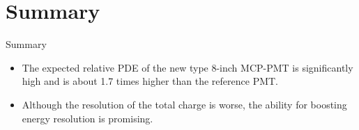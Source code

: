 \documentclass[aspectratio=169]{beamer}
\begin{document}
\section{Summary}
\begin{frame}{Summary}
    \begin{itemize}
    \item The expected relative PDE of the new type 8-inch MCP-PMT is significantly high and is about 1.7 times higher than the reference PMT. 
    \item Although the resolution of the total charge is worse, the ability for boosting energy resolution is promising.
    \end{itemize}
\end{frame}
\end{document}
